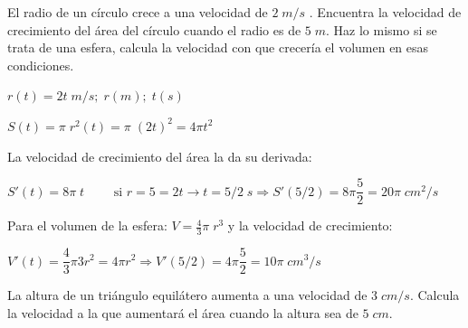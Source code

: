 	\begin{ejre} El radio de un círculo crece a una velocidad de  $2\; m/s$	. Encuentra la velocidad de crecimiento del área del círculo cuando el radio es de $5\; m$. Haz lo mismo si se trata de una esfera, calcula la velocidad con que crecería el volumen en esas condiciones.
	\end{ejre}
	
	\begin{proofw}\renewcommand{\qedsymbol}{$\diamond$}
	
	\hspace{5mm} $r(t)=2t\; m/s;\; r(m);\; t(s)$
	
	$S(t)=\pi \; r^2(t)=\pi\; (2t)^2= 4\pi t^2$
	
	La velocidad de crecimiento del área la da su derivada:
	
	$S'(t)=8\pi\; t \qquad \mbox{ si } r=5=2t \to t=5/2\; s \Rightarrow S'(5/2)=8\pi \dfrac 5 2 = 20 \pi \; cm^2/s $
	
	Para el volumen de la esfera: $V=\frac 4 3 \pi \; r^3$ y la velocidad de crecimiento:
	
	$V'(t)=\dfrac 4 3 \pi 3r^2=4\pi r^2 \Rightarrow V'(5/2)=4\pi \dfrac 5 2=10\pi \; cm^3/s$
	
	\end{proofw}
	
	
	\begin{ejre} 	La altura de un triángulo equilátero aumenta a una velocidad de $3\; cm/s$. Calcula la velocidad a la que aumentará el área cuando la altura sea de $5\; cm$.
	\end{ejre}
	
